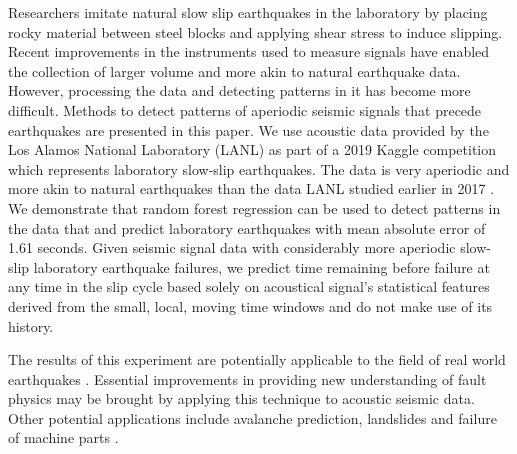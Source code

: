 \documentclass[]{llncs} %
\begin{document}
Researchers imitate natural slow slip earthquakes in the laboratory by placing rocky material between steel blocks and applying shear stress to induce slipping. Recent improvements in the instruments \cite{kaggle} used to measure signals have enabled the collection of larger volume and more akin to natural earthquake data. However, processing the data and detecting patterns in it has become more difficult. Methods to detect patterns of aperiodic seismic signals that precede earthquakes are presented in this paper. We use acoustic data provided by the Los Alamos National Laboratory (LANL) as part of a 2019 Kaggle competition \cite{kaggle} which represents laboratory slow-slip earthquakes. The data is very aperiodic and more akin to natural earthquakes than the data LANL studied earlier in 2017 \cite{kaggle}. We demonstrate that random forest regression can be used to detect patterns in the data that and predict laboratory earthquakes with mean absolute error of 1.61 seconds. Given seismic signal data with considerably more aperiodic slow-slip laboratory earthquake failures, we predict time remaining before failure at any time in the slip cycle based solely on acoustical signal's statistical features derived from the small, local, moving time windows and do not make use of its history.\par
The results of this experiment are potentially applicable to the field of real world earthquakes \cite{Bertrand}. Essential improvements in providing new understanding of fault physics may be brought by applying this technique to acoustic seismic data. Other potential applications include avalanche prediction, landslides and failure of machine parts \cite{Bertrand}. \par
\end{document}

